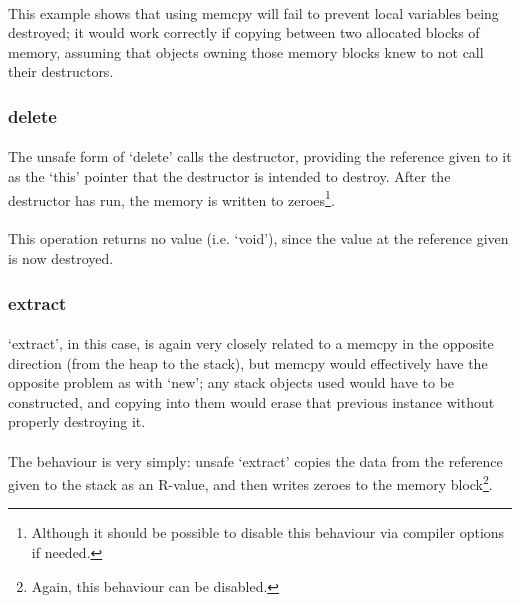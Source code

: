 \documentclass[12pt,twoside,notitlepage]{report}
\begin{document}
\paragraph{}
This example shows that using memcpy will fail to prevent local variables being destroyed; it would work correctly if copying between two allocated blocks of memory, assuming that objects owning those memory blocks knew to not call their destructors.

\subsubsection{delete}

\paragraph{}
The unsafe form of `delete' calls the destructor, providing the reference given to it as the `this' pointer that the destructor is intended to destroy. After the destructor has run, the memory is written to zeroes\footnote{Although it should be possible to disable this behaviour via compiler options if needed.}.

\paragraph{}
This operation returns no value (i.e. `void'), since the value at the reference given is now destroyed.

\subsubsection{extract}

\paragraph{}
`extract', in this case, is again very closely related to a memcpy in the opposite direction (from the heap to the stack), but memcpy would effectively have the opposite problem as with `new'; any stack objects used would have to be constructed, and copying into them would erase that previous instance without properly destroying it.

\paragraph{}
The behaviour is very simply: unsafe `extract' copies the data from the reference given to the stack as an R-value, and then writes zeroes to the memory block\footnote{Again, this behaviour can be disabled.}.
\end{document}
